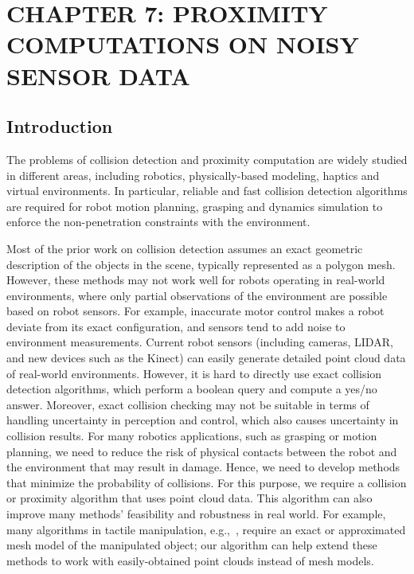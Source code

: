 \chapter[PROXIMITY COMPUTATIONS ON NOISY SENSOR DATA]{CHAPTER 7: PROXIMITY COMPUTATIONS ON NOISY \\ SENSOR DATA}
\label{chp:PCollide}

\section{Introduction}
The problems of collision detection and proximity computation are widely studied in different areas, including robotics, physically-based modeling, haptics and virtual environments. In particular, reliable and fast collision detection algorithms are required for robot motion planning, grasping and dynamics simulation to enforce the non-penetration constraints with the environment.

Most of the prior work on collision detection assumes an exact geometric description of the objects in the scene, typically represented as a polygon mesh. However, these methods may not work well
for robots operating in real-world environments, where only partial observations of the environment are possible based on robot sensors. For example, inaccurate motor control makes a robot deviate from its
exact configuration, and sensors tend to add noise to environment measurements.
Current robot sensors (including cameras, LIDAR, and new devices such as the Kinect) can easily generate detailed point cloud data of real-world environments. However, it is hard to directly use exact collision detection algorithms, which perform a boolean query and compute a yes/no answer.
Moreover, exact collision checking may not be suitable in terms of
handling uncertainty in perception and control, which also causes uncertainty in collision results.
For many robotics applications, such as grasping or motion planning, we need to reduce the risk
of physical contacts between the robot and the environment that may result in damage. Hence, we need to develop methods that minimize the probability of collisions. For this purpose, we require a collision or proximity algorithm that uses point cloud data. 
This algorithm can also improve many methods' feasibility and robustness in real world. For example, many algorithms in tactile manipulation, e.g.,~\cite{anna:2011}, require an exact or approximated mesh model of the manipulated object; our algorithm can help extend these methods to work with easily-obtained point clouds instead of mesh models.

